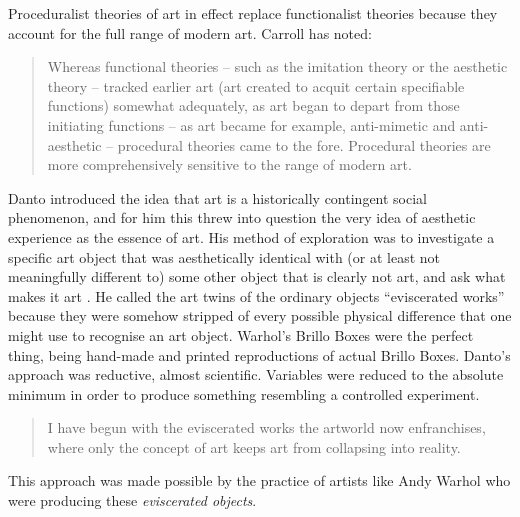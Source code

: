         Proceduralist theories of art in effect replace functionalist theories because they account for the full range of modern art. Carroll has noted:

        \begin{quote}
            Whereas functional theories – such as the imitation theory or the aesthetic theory – tracked earlier art (art created to acquit certain specifiable functions) somewhat adequately, as art began to depart from those initiating functions – as art became for example, anti-mimetic and anti-aesthetic – procedural theories came to the fore. Procedural theories are more comprehensively sensitive to the range of modern art. \citep[p.101]{CarrollHstrclNrrtvs2001}
        \end{quote}
        
        Danto introduced the idea that art is a historically contingent social phenomenon, and for him this threw into question the very idea of aesthetic experience as the essence of art. His method of exploration was to investigate a specific art object that was aesthetically identical with (or at least not meaningfully different to) some other object that is clearly not art, and ask what makes it art \citep[p.115]{DantoWhtArtIs2013}. He called the art twins of the ordinary objects “eviscerated works” because they were somehow stripped of every possible physical difference that one might use to recognise an art object. Warhol's Brillo Boxes were the perfect thing, being hand-made and printed reproductions of actual Brillo Boxes. Danto's approach was reductive, almost scientific. Variables were reduced to the absolute minimum in order to produce something resembling a controlled experiment.

        \begin{quote}
            I have begun with the eviscerated works the artworld now enfranchises, where only the concept of art keeps art from collapsing into reality. \citep[p.140]{DantoThTrnsfrtnOfThCmmnplc1974}
        \end{quote}

        This approach was made possible by the practice of artists like Andy Warhol who were producing these \emph{eviscerated objects}.

